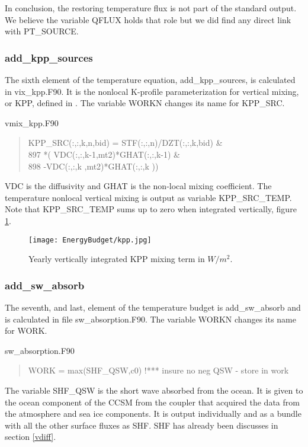 In conclusion, the restoring temperature flux is not part of the standard output. We believe the variable QFLUX holds that role but we did find any direct link with PT\_SOURCE.

\subsubsection{add\_kpp\_sources}

The sixth element of the temperature equation, add\_kpp\_sources, is calculated in vix\_kpp.F90. It is the nonlocal K-profile parameterization for vertical mixing, or KPP, defined in \cite{ROG:ROG1432}. The variable WORKN changes its name for KPP\_SRC.
\begin{center} vmix\_kpp.F90 \end{center}
\begin{quotation}
\small
\linespread{0.5}\selectfont{} \hspace{1em}            KPP\_SRC(:,:,k,n,bid) = STF(:,:,n)/DZT(:,:,k,bid)         \&\\
897     \hspace{1em}                            *( VDC(:,:,k-1,mt2)*GHAT(:,:,k-1)   \&\\
898    \hspace{1em}                               -VDC(:,:,k  ,mt2)*GHAT(:,:,k  ))\\
\end{quotation}
VDC is the diffusivity and GHAT is the non-local mixing coefficient. The temperature nonlocal vertical mixing is output as variable KPP\_SRC\_TEMP. Note that KPP\_SRC\_TEMP sums up to zero when integrated vertically, figure \ref{kpp}. 

\begin{figure}
\center
\texttt{[image: EnergyBudget/kpp.jpg]}
\caption{Yearly vertically integrated KPP mixing term in $W/m^2$.}
\label{kpp}
\end{figure}


\subsubsection{add\_sw\_absorb}

The seventh, and last, element of the temperature budget is add\_sw\_absorb and is calculated in file sw\_absorption.F90. The variable WORKN changes its name for WORK. 
\begin{center} sw\_absorption.F90 \end{center}
\begin{quotation}
\small
\linespread{0.5}\selectfont{} \hspace{1em}     WORK = max(SHF\_QSW,c0) !*** insure no neg QSW - store in work\\
\end{quotation}
\noindent The variable SHF\_QSW is the short wave absorbed from the ocean. It is given to the ocean component of the CCSM from the coupler that acquired the data from the atmosphere and sea ice components. It is output individually and as a bundle with all the other surface fluxes as SHF. SHF has already been discusses in section \ref{vdiff}.

